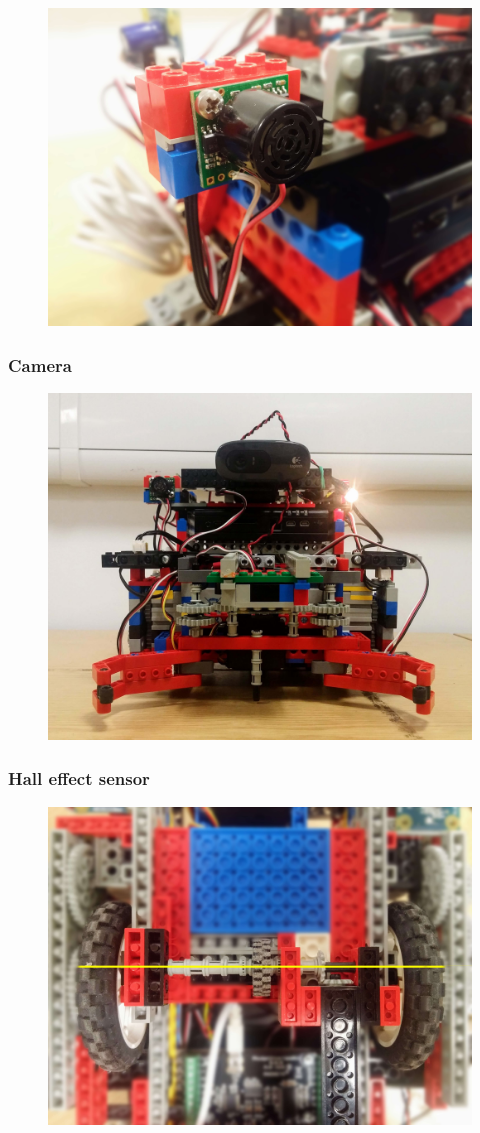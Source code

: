 \begin{figure}[ht]
    \centering
    \includegraphics[width=0.7\linewidth]{res/robot-pics/sonar-placement.jpg}
    \caption{}
    \label{fig:}
\end{figure}

\subsubsection{Camera}

\begin{figure}[ht]
    \centering
    \includegraphics[width=0.7\linewidth]{res/robot-pics/view-front.jpg}
    \caption{}
    \label{fig:}
\end{figure}

\subsubsection{Hall effect sensor}

\begin{figure}[ht]
    \centering
    \includegraphics[width=0.7\linewidth]{res/robot-pics/pivot-wheel-layout.jpg}
    \caption{}
    \label{fig:}
\end{figure}

